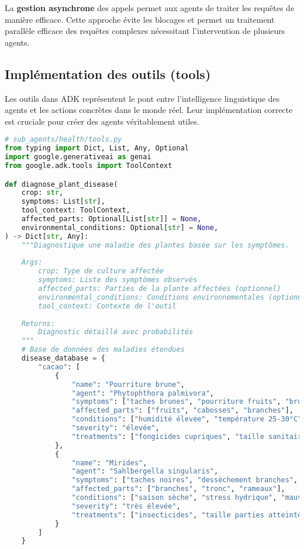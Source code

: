 La \textbf{gestion asynchrone} des appels permet aux agents de traiter les requêtes de manière efficace. Cette approche évite les blocages et permet un traitement parallèle efficace des requêtes complexes nécessitant l'intervention de plusieurs agents.

\subsection{Implémentation des outils (tools)}

Les outils dans ADK représentent le pont entre l'intelligence linguistique des agents et les actions concrètes dans le monde réel. Leur implémentation correcte est cruciale pour créer des agents véritablement utiles.

 
\begin{lstlisting}[language=Python, caption=Outil de diagnostic des maladies]
# sub_agents/health/tools.py
from typing import Dict, List, Any, Optional
import google.generativeai as genai
from google.adk.tools import ToolContext

def diagnose_plant_disease(
    crop: str,
    symptoms: List[str],
    tool_context: ToolContext,
    affected_parts: Optional[List[str]] = None,
    environmental_conditions: Optional[str] = None,
) -> Dict[str, Any]:
    """Diagnostique une maladie des plantes basée sur les symptômes.
    
    Args:
        crop: Type de culture affectée
        symptoms: Liste des symptômes observés
        affected_parts: Parties de la plante affectées (optionnel)
        environmental_conditions: Conditions environnementales (optionnel)
        tool_context: Contexte de l'outil
        
    Returns:
        Diagnostic détaillé avec probabilités
    """
    # Base de données des maladies étendues
    disease_database = {
        "cacao": [
            {
                "name": "Pourriture brune",
                "agent": "Phytophthora palmivora",
                "symptoms": ["taches brunes", "pourriture fruits", "brunissement cabosses", "exsudat"],
                "affected_parts": ["fruits", "cabosses", "branches"],
                "conditions": ["humidité élevée", "température 25-30°C", "blessures"],
                "severity": "élevée",
                "treatments": ["fongicides cupriques", "taille sanitaire", "amélioration drainage"]
            },
            {
                "name": "Mirides",
                "agent": "Sahlbergella singularis",
                "symptoms": ["taches noires", "dessèchement branches", "écoulement sève", "chancres"],
                "affected_parts": ["branches", "tronc", "rameaux"],
                "conditions": ["saison sèche", "stress hydrique", "mauvais entretien"],
                "severity": "très élevée",
                "treatments": ["insecticides", "taille parties atteintes", "amélioration ombrage"]
            }
        ]
    }
    

\end{lstlisting}
